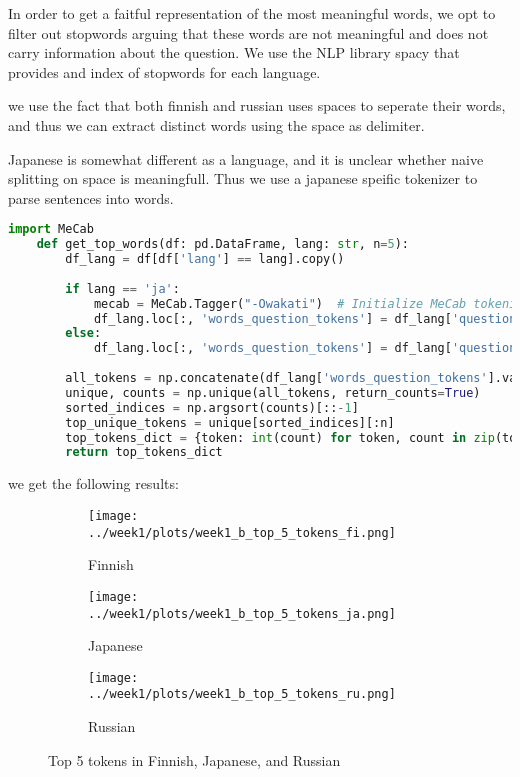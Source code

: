 \documentclass{article}
\begin{document}
\begin{enumerate}
    In order to get a faitful representation of the most meaningful words, we opt to filter out stopwords arguing that these words are not meaningful and does not carry information about the question.
    We use the NLP library spacy that provides and index of stopwords for each language.

    we use the fact that both finnish and russian uses spaces to seperate their words, and thus we can extract distinct words using the space as delimiter.

    Japanese is somewhat different as a language, and it is unclear whether naive splitting on space is meaningfull. 
    Thus we use a japanese speific tokenizer to parse sentences into words.

    \begin{lstlisting}[language=Python]
    import MeCab
    def get_top_words(df: pd.DataFrame, lang: str, n=5):
        df_lang = df[df['lang'] == lang].copy()
        
        if lang == 'ja':
            mecab = MeCab.Tagger("-Owakati")  # Initialize MeCab tokenizer
            df_lang.loc[:, 'words_question_tokens'] = df_lang['question'].apply(lambda x: mecab.parse(x).split())
        else:
            df_lang.loc[:, 'words_question_tokens'] = df_lang['question'].apply(lambda x: x.split(' '))
        
        all_tokens = np.concatenate(df_lang['words_question_tokens'].values)
        unique, counts = np.unique(all_tokens, return_counts=True)
        sorted_indices = np.argsort(counts)[::-1]
        top_unique_tokens = unique[sorted_indices][:n]
        top_tokens_dict = {token: int(count) for token, count in zip(top_unique_tokens, counts[sorted_indices][:n])}
        return top_tokens_dict
    \end{lstlisting}


    we get the following results:

    \begin{figure}[h]
        \centering
        \begin{subfigure}[b]{0.3\textwidth}
            \centering
            \texttt{[image: ../week1/plots/week1\_b\_top\_5\_tokens\_fi.png]}
            \caption{Finnish}
            \label{fig:top_5_tokens_fi}
        \end{subfigure}
        \hfill
        \begin{subfigure}[b]{0.3\textwidth}
            \centering
            \texttt{[image: ../week1/plots/week1\_b\_top\_5\_tokens\_ja.png]}
            \caption{Japanese}
            \label{fig:top_5_tokens_ja}
        \end{subfigure}
        \hfill
        \begin{subfigure}[b]{0.3\textwidth}
            \centering
            \texttt{[image: ../week1/plots/week1\_b\_top\_5\_tokens\_ru.png]}
            \caption{Russian}
            \label{fig:top_5_tokens_ru}
        \end{subfigure}
        \caption{Top 5 tokens in Finnish, Japanese, and Russian}
        \label{fig:top_5_tokens_all}
    \end{figure}


\end{enumerate}
\end{document}
